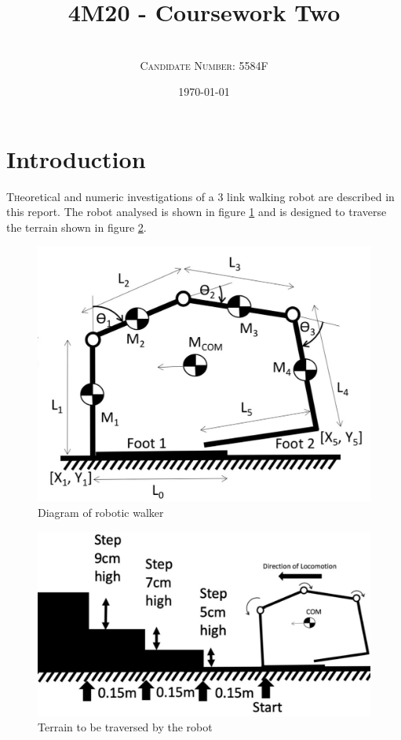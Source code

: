 \documentclass[twoside,twocolumn]{article}
\title{4M20 - Coursework Two} %
\author{%
\\
\textsc{Candidate Number: 5584F}%
}
\date{\today} %
\begin{document}
\onecolumn

\twocolumn
{}
\maketitle


\section{Introduction}

\lettrine[nindent=0em,lines=3]{T}heoretical and numeric investigations of a 3 link walking robot are described in this report. The robot analysed is shown in figure \ref{fig:diagram} and is designed to traverse the terrain shown in figure \ref{fig:ter}.	

\begin{figure}[h]
  \centering
    \includegraphics[width=\linewidth]{diagram}
  \caption{Diagram of robotic walker}
  \label{fig:diagram}
\end{figure}

\begin{figure}[h]
  \centering
    \includegraphics[width=\linewidth]{terrain}
  \caption{Terrain to be traversed by the robot}
  \label{fig:ter}
\end{figure}
\end{document}
